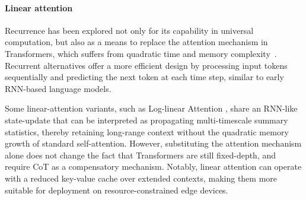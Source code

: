 \paragraph{Linear attention}

Recurrence has been explored not only for its capability in universal computation, but also as a means to replace the attention mechanism in Transformers, which suffers from quadratic time and memory complexity~\citep{Dao2024TransformersAS}. Recurrent alternatives offer a more efficient design by processing input tokens sequentially and predicting the next token at each time step, similar to early RNN-based language models.

Some linear-attention variants, such as Log-linear Attention \cite{guo2025log}, share an RNN-like state-update that can be interpreted as propagating multi-timescale summary statistics, thereby retaining long-range context without the quadratic memory growth of standard self-attention.
However, substituting the attention mechanism alone does not change the fact that Transformers are still fixed-depth, and require CoT as a compensatory mechanism. Notably, linear attention can operate with a reduced key-value cache over extended contexts, making them more suitable for deployment on resource-constrained edge devices.
